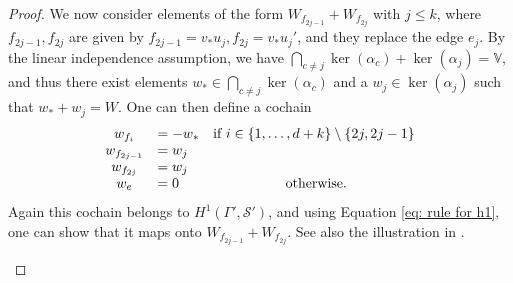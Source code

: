 \documentclass{article}
\theoremstyle{definition}
\theoremstyle{remark}
\begin{document}
\begin{proof}
We now consider elements of the form $W_{f_{2j -1}} + W_{f_{2j}}$ with $j\leq k$, where $f_{2j-1},f_{2j}$ are given by $f_{2j-1} = v_*u_j, f_{2j} = v_*u_j'$, and they replace the edge $e_{j}$. By the linear independence assumption, we have $\bigcap_{c \neq j} \ker(\alpha_c) + \ker(\alpha_j) = \mathbb{V}$, and thus there exist elements $w_{*} \in \bigcap_{c \neq j} \ker(\alpha_c)$ and a $w_j \in \ker(\alpha_j)$ such that $w_* + w_j  = W$. One can then define a cochain
\begin{equation*}
\begin{array}{clcc}
    w_{f_{i}} &= - w_{*}  & \textup{if } i\in \{1, \dots, d+k\} \setminus \{2j, 2j-1\}\\
    w_{f_{2j-1}} &= w_{j}  & \\
    w_{f_{2j}} &= w_{j}  & \\
    w_{e} &=0  &\textup{ otherwise.}
\end{array}
\end{equation*}
 Again this cochain belongs to $H^{1}(\Gamma', \mathcal{S}')$, and using Equation \eqref{eq: rule for h1}, one can show that it maps onto $W_{f_{2j-1}} + W_{f_{2j}}$. See also the illustration in .\\


\begin{figure}[h!]
\centering
{}
\end{figure}
\end{proof}
\end{document}
